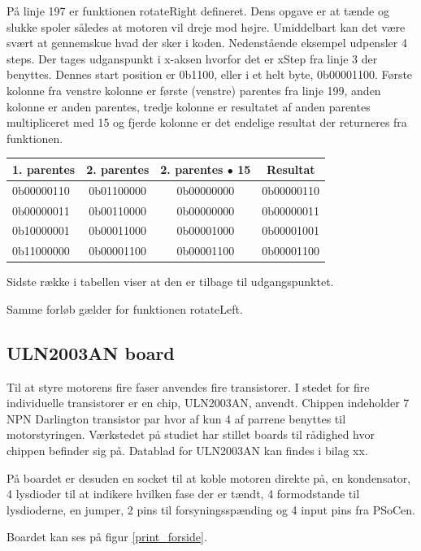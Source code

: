 På linje 197 er funktionen rotateRight defineret. Dens opgave er at tænde og slukke spoler således at motoren vil dreje mod højre. Umiddelbart kan det være svært at gennemskue hvad der sker i koden. Nedenstående eksempel udpensler 4 steps. Der tages udganspunkt i x-aksen hvorfor det er xStep fra linje 3 der benyttes. Dennes start position er 0b1100, eller i et helt byte, 0b00001100. Første kolonne fra venstre kolonne er første (venstre) parentes fra linje 199, anden kolonne er anden parentes, tredje kolonne er resultatet af anden parentes multipliceret med 15 og fjerde kolonne er det endelige resultat der returneres fra funktionen.

\begin{table}
\begin{tabular}{| l | c | c | c |}
1. parentes & 2. parentes & 2. parentes $\bullet$ 15 & Resultat\\\hline
0b00000110 & 0b01100000 & 0b00000000 & 0b00000110\\\hline
0b00000011 & 0b00110000 & 0b00000000 & 0b00000011\\\hline
0b10000001 & 0b00011000 & 0b00001000 & 0b00001001\\\hline
0b11000000 & 0b00001100 & 0b00001100 & 0b00001100\\\hline
\end{tabular}
\end{table}

Sidste række i tabellen viser at den er tilbage til udgangspunktet.

Samme forløb gælder for funktionen rotateLeft.

\subsection{ULN2003AN board}
Til at styre motorens fire faser anvendes fire transistorer. I stedet for fire individuelle transistorer er en chip, ULN2003AN, anvendt. Chippen indeholder 7 NPN Darlington transistor par hvor af kun 4 af parrene benyttes til motorstyringen. Værkstedet på studiet har stillet boards til rådighed hvor chippen befinder sig på. Datablad for ULN2003AN kan findes i bilag xx.

På boardet er desuden en socket til at koble motoren direkte på, en kondensator, 4 lysdioder til at indikere hvilken fase der er tændt, 4 formodstande til lysdioderne, en jumper, 2 pins til forsyningsspænding og 4 input pins fra PSoCen.

Boardet kan ses på figur \ref{print_forside}.

